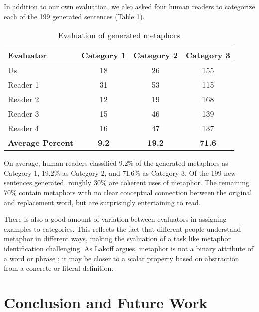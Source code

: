 \documentclass[12pt]{article}
\begin{document}
In addition to our own evaluation, we also asked four human readers to categorize each of the 199 generated sentences (Table \ref{tab:catresults}).

\begin{table}[H]
    \centering
    \small
    \begin{tabular}{|l|c|c|c|} \hline
    \textbf{Evaluator} & \textbf{Category 1} & \textbf{Category 2} & \textbf{Category 3} \\ \hline
    Us & 18 & 26 & 155\\ \hline
    Reader 1 & 31 & 53 & 115\\ \hline
    Reader 2 & 12 & 19 & 168\\ \hline
    Reader 3 & 15 & 46 & 139\\ \hline
    Reader 4 & 16 & 47 & 137\\ \hline
    \textbf{Average Percent} & \textbf{9.2} & \textbf{19.2} & \textbf{71.6} \\ \hline
    \end{tabular}
    \caption{Evaluation of generated metaphors}
    \label{tab:catresults}
\end{table}

On average, human readers classified 9.2\% of the generated metaphors as Category 1, 19.2\% as Category 2, and 71.6\% as Category 3. Of the 199 new sentences generated, roughly 30\% are coherent uses of metaphor. The remaining 70\% contain metaphors with no clear conceptual connection between the original and replacement word, but are surprisingly entertaining to read.

There is also a good amount of variation between evaluators in assigning examples to categories. This reflects the fact that different people understand metaphor in different ways, making the evaluation of a task like metaphor identification challenging. As Lakoff argues, metaphor is not a binary attribute of a word or phrase \cite{lakoff80}; it may be closer to a scalar property based on abstraction from a concrete or literal definition.

\section{Conclusion and Future Work}
\end{document}
